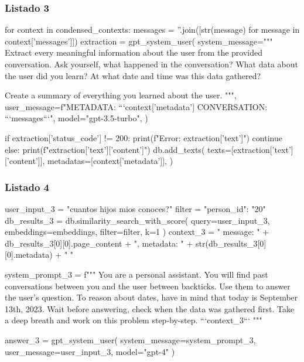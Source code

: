 \subsubsection{Listado 3}
\label{anexo:code-4-1-13-3}

\begin{APACode}
for context in condensed_contexts:
    messages = ''.join([str(message) for message in context['messages']])
    extraction = gpt_system_user(
        system_message="""
        Extract every meaningful information about the user from the provided conversation. 
        Ask yourself, what happened in the conversation?
        What data about the user did you learn?
        At what date and time was this data gathered?
        
        Create a summary of everything you learned about the user. """,
        user_message=f"METADATA: ```{context['metadata']} CONVERSATION: ```{messages}```",
        model="gpt-3.5-turbo",
    )
    
    if extraction['status_code'] != 200:
        print(f"Error: {extraction['text']}")
        continue
    else:
        print(f"{extraction['text']['content']}")
        db.add_texts(
            texts=[extraction['text']['content']],
            metadatas=[context['metadata']],
        )
\end{APACode}

\subsubsection{Listado 4}
\label{anexo:code-4-1-13-4}

\begin{APACode}
user_input_3 = "cuantos hijos mios conoces?"
filter = {"person_id": "20"}
db_results_3 = db.similarity_search_with_score(
    query=user_input_3, 
    embeddings=embeddings, 
    filter=filter, 
    k=1
)
context_3 = "{ message: " + db_results_3[0][0].page_content + ", metadata: " + str(db_results_3[0][0].metadata) + " }"

system_prompt_3 = f"""
You are a personal assistant. You will find past conversations between you and the user between backticks. 
Use them to answer the user's question.
To reason about dates, have in mind that today is September 13th, 2023. 
Wait before answering, check when the data was gathered first.
Take a deep breath and work on this problem step-by-step.
```{context_3}```
"""

answer_3 = gpt_system_user(
    system_message=system_prompt_3, 
    user_message=user_input_3, 
    model="gpt-4"
)
\end{APACode}

